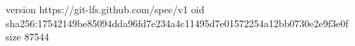version https://git-lfs.github.com/spec/v1
oid sha256:17542149be85094dda96fd7e234a4c11495d7e01572254a12bb0730e2e9f3e0f
size 87544
